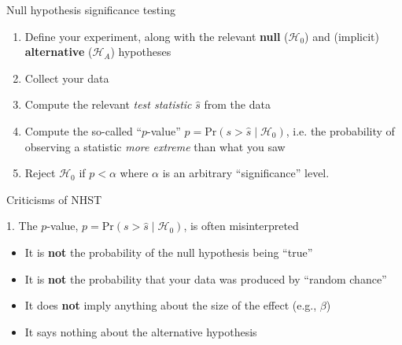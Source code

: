 \documentclass[12pt,aspectratio=169]{beamer}
\newcommand{\prob}{\text{Pr}}
\begin{document}
\begin{frame}{Null hypothesis significance testing}

\begin{enumerate}
    \item Define your experiment, along with the relevant \textbf{null} ($\mathcal{H}_0$) and (implicit) \textbf{alternative} ($\mathcal{H}_A$) hypotheses
    \newline
    \item Collect your data
    \newline
    \item Compute the relevant \textit{test statistic} $\hat{s}$ from the data
    \newline
    \item Compute the so-called ``$p$-value'' $p = \prob(s > \hat{s} \mid \mathcal{H}_0)$, i.e. the probability of observing a statistic \textit{more extreme} than what you saw
    \newline
    \item Reject $\mathcal{H}_0$ if $p < \alpha$ where $\alpha$ is an arbitrary ``significance'' level.
\end{enumerate}

\end{frame}

\begin{frame}{Criticisms of NHST}

1. The $p$-value, $p = \prob(s > \hat{s} \mid \mathcal{H}_0)$, is often misinterpreted
\pause

\begin{itemize}[<+->]
    \item It is \textbf{not} the probability of the null hypothesis being ``true''
     \newline
    \item It is \textbf{not} the probability that your data was produced by ``random chance''
     \newline
    \item It does \textbf{not} imply anything about the size of the effect (e.g., $\beta$)
     \newline
    \item It says nothing about the alternative hypothesis
\end{itemize}

\end{frame}
\end{document}
